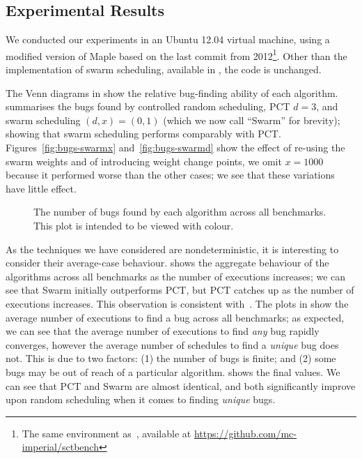\subsection{Experimental Results}
\label{sec:algorithms-eval-results}

We conducted our experiments in an Ubuntu 12.04 virtual machine, using a
modified version of Maple based on the last commit from 2012\footnote{The same
environment as~\cite{thomson2016}, available
at \url{https://github.com/mc-imperial/sctbench}}.  Other than the
implementation of swarm scheduling, available in , the code is
unchanged.

The Venn diagrams in  show the relative bug-finding ability of each
algorithm.   summarises the bugs found by controlled random
scheduling, PCT $d=3$, and swarm scheduling $(d,x)=(0,1)$ (which we now call
``Swarm'' for brevity); showing that swarm scheduling performs comparably with
PCT.  Figures~\ref{fig:bugs-swarmx} and~\ref{fig:bugs-swarmd} show the effect of
re-using the swarm weights and of introducing weight change points, we omit
$x=1000$ because it performed worse than the other cases; we see that these
variations have little effect.

\begin{figure}
  \centering
  
  \caption[Plot of bugs found by each scheduling algorithm.]{The number of bugs found by each algorithm across all benchmarks.  This plot is intended to be viewed with colour.}\label{fig:totalbugs}
\end{figure}

As the techniques we have considered are nondeterministic, it is interesting to
consider their average-case behaviour.   shows the aggregate
behaviour of the algorithms across all benchmarks as the number of executions
increases; we can see that Swarm initially outperforms PCT, but PCT catches up
as the number of executions increases.  This observation is consistent
with~\cite{thomson2016}.  The plots in  show the average number
of executions to find a bug across all benchmarks; as expected, we can see that
the average number of executions to find \emph{any} bug rapidly converges,
however the average number of schedules to find a \emph{unique} bug does not.
This is due to two factors: (1) the number of bugs is finite; and (2) some bugs
may be out of reach of a particular algorithm.   shows the final
values.  We can see that PCT and Swarm are almost identical, and both
significantly improve upon random scheduling when it comes to
finding \emph{unique} bugs.

